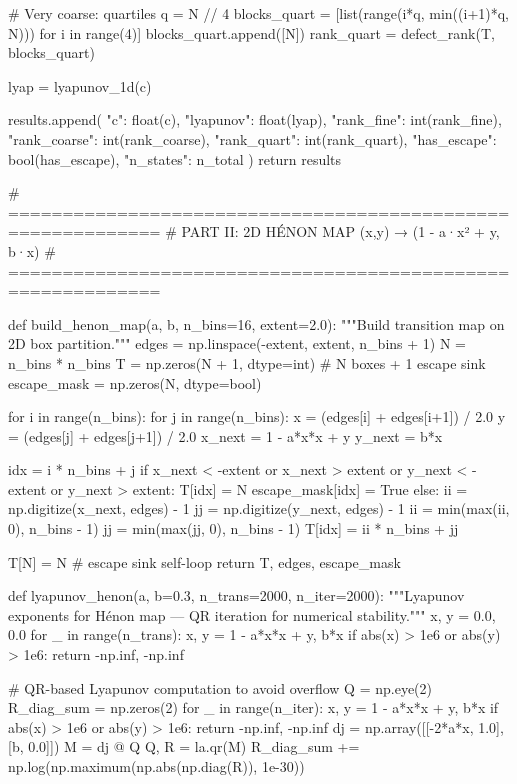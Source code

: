 {{{{{{{{{{{{{        # Very coarse: quartiles
        q = N // 4
        blocks_quart = [list(range(i*q, min((i+1)*q, N))) for i in range(4)]
        blocks_quart.append([N])
        rank_quart = defect_rank(T, blocks_quart)
        
        lyap = lyapunov_1d(c)
        
        results.append({
            "c": float(c),
            "lyapunov": float(lyap),
            "rank_fine": int(rank_fine),
            "rank_coarse": int(rank_coarse),
            "rank_quart": int(rank_quart),
            "has_escape": bool(has_escape),
            "n_states": n_total
        })
    return results


# ============================================================
# PART II: 2D HÉNON MAP  (x,y) → (1 - a·x² + y, b·x)
# ============================================================

def build_henon_map(a, b, n_bins=16, extent=2.0):
    """Build transition map on 2D box partition."""
    edges = np.linspace(-extent, extent, n_bins + 1)
    N = n_bins * n_bins
    T = np.zeros(N + 1, dtype=int)  # N boxes + 1 escape sink
    escape_mask = np.zeros(N, dtype=bool)
    
    for i in range(n_bins):
        for j in range(n_bins):
            x = (edges[i] + edges[i+1]) / 2.0
            y = (edges[j] + edges[j+1]) / 2.0
            x_next = 1 - a*x*x + y
            y_next = b*x
            
            idx = i * n_bins + j
            if x_next < -extent or x_next > extent or y_next < -extent or y_next > extent:
                T[idx] = N
                escape_mask[idx] = True
            else:
                ii = np.digitize(x_next, edges) - 1
                jj = np.digitize(y_next, edges) - 1
                ii = min(max(ii, 0), n_bins - 1)
                jj = min(max(jj, 0), n_bins - 1)
                T[idx] = ii * n_bins + jj
    
    T[N] = N  # escape sink self-loop
    return T, edges, escape_mask


def lyapunov_henon(a, b=0.3, n_trans=2000, n_iter=2000):
    """Lyapunov exponents for Hénon map — QR iteration for numerical stability."""
    x, y = 0.0, 0.0
    for _ in range(n_trans):
        x, y = 1 - a*x*x + y, b*x
        if abs(x) > 1e6 or abs(y) > 1e6:
            return -np.inf, -np.inf
    
    # QR-based Lyapunov computation to avoid overflow
    Q = np.eye(2)
    R_diag_sum = np.zeros(2)
    for _ in range(n_iter):
        x, y = 1 - a*x*x + y, b*x
        if abs(x) > 1e6 or abs(y) > 1e6:
            return -np.inf, -np.inf
        dj = np.array([[-2*a*x, 1.0], [b, 0.0]])
        M = dj @ Q
        Q, R = la.qr(M)
        R_diag_sum += np.log(np.maximum(np.abs(np.diag(R)), 1e-30))
    
}}}}}}}}}}}}}
